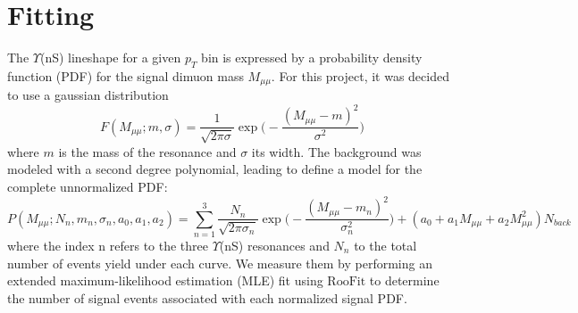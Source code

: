 \documentclass[a4paper,11pt]{article}
\begin{document}
\section{Fitting}
The $\Upsilon$(nS) lineshape for a given $p_T$ bin is expressed by a probability density function (PDF) for the signal dimuon mass $M_{\mu\mu}$. For this project, it was decided to use a gaussian distribution
\begin{equation}
    F(M_{\mu\mu};m,\sigma)=\frac{1}{\sqrt{2\pi \sigma}} \exp\biggl(-\frac{(M_{\mu\mu}-m)^2}{\sigma^2}\biggr)
\end{equation}
where $m$ is the mass of the resonance and $\sigma$ its width. 
The background was modeled with a second degree polynomial, leading to define a model for the complete unnormalized PDF:
\begin{equation}\label{model}
    P(M_{\mu\mu};N_n,m_n,\sigma_n,a_0,a_1,a_2)=
    \sum_{n=1}^3 \frac{N_n}{\sqrt{2\pi \sigma_n}} \exp\biggl(-\frac{(M_{\mu\mu}-m_n)^2}{\sigma_n^2}\biggr)+(a_0+a_1M_{\mu\mu}+a_2M_{\mu\mu}^2)N_{back}
\end{equation}
where the index n refers to the three $\Upsilon$(nS) resonances and $N_n$ to the total number of events yield under each curve. We measure them by performing an extended maximum-likelihood estimation (MLE) fit using $\text{RooFit}$ to determine the number of signal events associated with each normalized signal PDF. 
\end{document}
